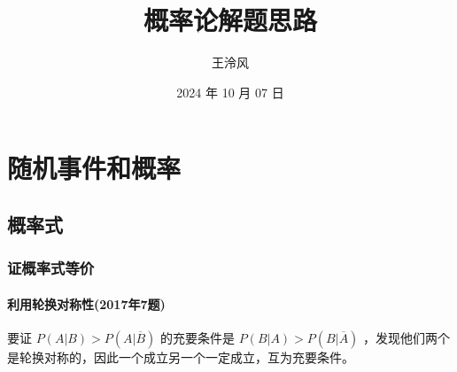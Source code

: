 \documentclass[a4paper,12pt,UTF8]{ctexart}
\begin{document}
    \title{概率论解题思路}
    \author{王泠风}
    \date{2024 年 10 月 07 日}
    \maketitle

    \section{随机事件和概率}

    \subsection{概率式}

    \subsubsection{证概率式等价}

    \paragraph{利用轮换对称性(2017年7题)}
    要证 \(P(A|B)>P(A|\overline{B})\) 的充要条件是 \(P(B|A)>P(B|\overline{A})\) ，发现他们两个是轮换对称的，因此一个成立另一个一定成立，互为充要条件。

    \subsection{}
\end{document}
